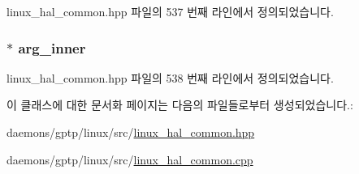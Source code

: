 linux\+\_\+hal\+\_\+common.\+hpp 파일의 537 번째 라인에서 정의되었습니다.

\subsubsection[{\texorpdfstring{arg\+\_\+inner}{arg_inner}}]{$\ast$ arg\+\_\+inner\hspace{0.3cm}{\ttfamily [private]}}\hypertarget{class_linux_thread_af6992b2f52fbe4a2362f1f0a81371185}{}\label{class_linux_thread_af6992b2f52fbe4a2362f1f0a81371185}


linux\+\_\+hal\+\_\+common.\+hpp 파일의 538 번째 라인에서 정의되었습니다.



이 클래스에 대한 문서화 페이지는 다음의 파일들로부터 생성되었습니다.\+:\begin{DoxyCompactItemize}
\item 
daemons/gptp/linux/src/\hyperlink{linux__hal__common_8hpp}{linux\+\_\+hal\+\_\+common.\+hpp}\item 
daemons/gptp/linux/src/\hyperlink{linux__hal__common_8cpp}{linux\+\_\+hal\+\_\+common.\+cpp}\end{DoxyCompactItemize}
